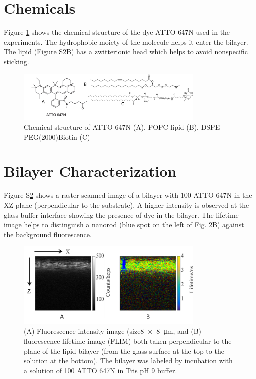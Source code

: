 \documentclass[11pt,a4paper,onecolumn]{article}
\begin{document}
\section{Chemicals}
Figure \ref{SIfig:chemical} shows the chemical structure of the dye ATTO 647N used in the experiments.
The hydrophobic moiety of the molecule helps it enter the bilayer.
The lipid (Figure S2B) has a zwitterionic head which helps to avoid nonspecific sticking.
\begin{figure}[ht]
  \centering
  \includegraphics[width=0.8\textwidth]{chemical_picture.png}
  \makeatletter
  \renewcommand{\fnum@figure}{\figurename~S\thefigure}
  \makeatother{}
  \caption{Chemical structure of ATTO 647N (A), POPC lipid (B), DSPE-PEG(2000)Biotin (C)}
  \label{SIfig:chemical}
\end{figure}
\section{Bilayer Characterization}
Figure S\ref{SIfig:xz-scan} shows a raster-scanned image of a bilayer with \SI{100}{\nM} ATTO 647N in the XZ plane (perpendicular to the substrate). 
A higher intensity is observed at the glass-buffer interface showing the presence of dye in the bilayer.
The lifetime image helps to distinguish a nanorod (blue spot on the left of Fig. \ref{SIfig:xz-scan}B) against the background fluorescence.
\begin{figure}[ht]
  \centering
  \includegraphics[width=0.8\textwidth]{xz_scan.png}
  \makeatletter
  \renewcommand{\fnum@figure}{\figurename~S\thefigure}
  \makeatother{}
  \caption{(A) Fluorescence intensity image (size\SI[product-units=repeat]{8x8}{\um}, and (B) fluorescence lifetime image (FLIM) both taken perpendicular to the plane of the lipid bilayer (from the glass surface at the top to the solution at the bottom).
  The bilayer was labeled by incubation with a solution of \SI{100}{\nM} ATTO 647N in Tris pH 9 buffer.}
  \label{SIfig:xz-scan}
\end{figure}
\end{document}
